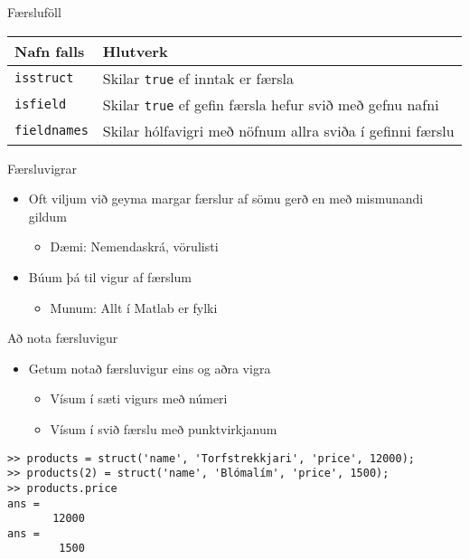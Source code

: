 \documentclass[handout]{beamer}
\begin{document}
\begin{frame}{Færsluföll}
\begin{center}
\begin{tabular}{lp{7cm}}
\toprule
Nafn falls&Hlutverk\\
\midrule
\texttt{isstruct}&Skilar \texttt{true} ef inntak er færsla\\
\texttt{isfield}&Skilar \texttt{true} ef gefin færsla hefur svið með gefnu nafni\\
\texttt{fieldnames}&Skilar hólfavigri með nöfnum allra sviða í gefinni færslu\\
\bottomrule
\end{tabular}
\end{center}
\end{frame}

\begin{frame}{Færsluvigrar}
\begin{itemize}
 \item Oft viljum við geyma margar færslur af sömu gerð en með mismunandi gildum
 \begin{itemize}
  \item Dæmi: Nemendaskrá, vörulisti
 \end{itemize}
 \item Búum þá til vigur af færslum
 \begin{itemize}
  \item Munum: Allt í Matlab er fylki
 \end{itemize}
\end{itemize}
\end{frame}

\begin{frame}[fragile]{Að nota færsluvigur}
\begin{itemize}
 \item Getum notað færsluvigur eins og aðra vigra
 \begin{itemize}
  \item Vísum í sæti vigurs með númeri
  \item Vísum í svið færslu með punktvirkjanum
 \end{itemize}
\end{itemize}
\begin{verbatim}
>> products = struct('name', 'Torfstrekkjari', 'price', 12000);
>> products(2) = struct('name', 'Blómalím', 'price', 1500);
>> products.price
ans =
       12000
ans =
        1500
\end{verbatim}

\end{frame}
\end{document}
